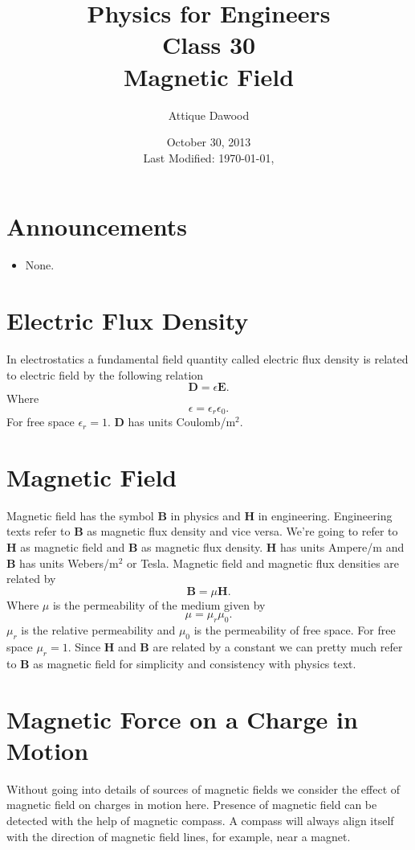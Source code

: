 \documentclass[12pt,a4paper]{article}
\title{\vspace{-3cm}Physics for Engineers\\Class 30\\Magnetic Field}
\author{Attique Dawood}
\date{October 30, 2013\\[0.2cm] Last Modified: \today, \currenttime}
\begin{document}
\maketitle
\section{Announcements}
\begin{itemize}
\item None.
\end{itemize}
\section{Electric Flux Density}
In electrostatics a fundamental field quantity called electric flux density is related to electric field by the following relation
\begin{equation}
\textbf{D}=\epsilon\textbf{E}.
\end{equation}
Where
\begin{equation}
\epsilon=\epsilon_r\epsilon_0.
\end{equation}
For free space $\epsilon_r=1$. \textbf{D} has units Coulomb/m$^2$.
\section{Magnetic Field}
Magnetic field has the symbol \textbf{B} in physics and \textbf{H} in engineering. Engineering texts refer to \textbf{B} as magnetic flux density and vice versa. We're going to refer to \textbf{H} as magnetic field and \textbf{B} as magnetic flux density. \textbf{H} has units Ampere/m and \textbf{B} has units Webers/m$^2$ or Tesla. Magnetic field and magnetic flux densities are related by
\begin{equation}
\textbf{B}=\mu\textbf{H}.
\end{equation}
Where $\mu$ is the permeability of the medium given by
\begin{equation}
\mu=\mu_r\mu_0.
\end{equation}
$\mu_r$ is the relative permeability and $\mu_0$ is the permeability of free space. For free space $\mu_r=1$. Since \textbf{H} and \textbf{B} are related by a constant we can pretty much refer to \textbf{B} as magnetic field for simplicity and consistency with physics text.
\section{Magnetic Force on a Charge in Motion}
Without going into details of sources of magnetic fields we consider the effect of magnetic field on charges in motion here. Presence of magnetic field can be detected with the help of magnetic compass. A compass will always align itself with the direction of magnetic field lines, for example, near a magnet.
\end{document}
